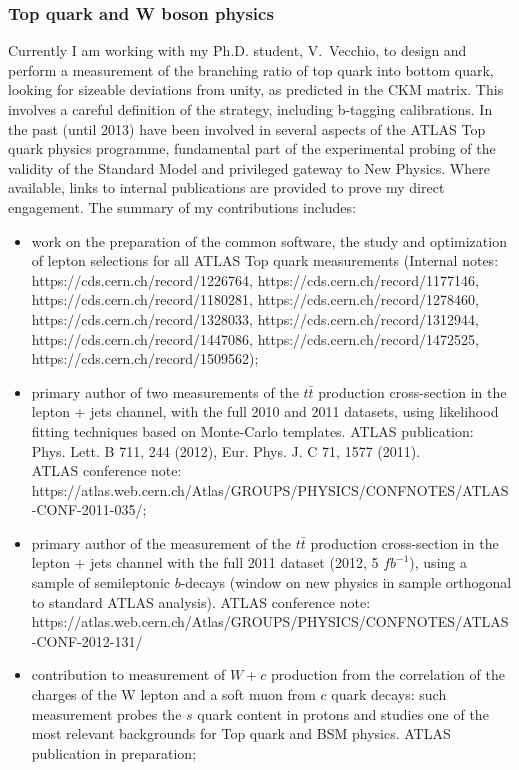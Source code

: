 \documentclass{article}
\begin{document}
\begin{vita}
\subsubsection*{Top quark and W boson physics}
Currently I am working with my Ph.D. student, V.~Vecchio, to design and perform a measurement of the branching ratio of top quark into bottom quark, looking for sizeable deviations from unity, as predicted in the CKM matrix. This involves a careful definition of the strategy, including b-tagging calibrations. 
In the past (until 2013) have been involved in several aspects of the ATLAS Top quark physics programme, fundamental part of the experimental probing of the validity of the Standard Model and privileged gateway to New Physics. 
Where available, links to internal publications are provided to prove my direct engagement. The summary of my contributions includes: 
\begin{itemize}
\item work on the preparation of the common software, the study and optimization of lepton selections for all ATLAS Top quark measurements (Internal notes: https://cds.cern.ch/record/1226764, https://cds.cern.ch/record/1177146, \\ https://cds.cern.ch/record/1180281, https://cds.cern.ch/record/1278460, \\ https://cds.cern.ch/record/1328033, https://cds.cern.ch/record/1312944, \\ https://cds.cern.ch/record/1447086, https://cds.cern.ch/record/1472525, \\ https://cds.cern.ch/record/1509562);
\item primary author of two measurements of the $t\bar{t}$ production cross-section in the lepton + jets channel, with the full 2010 and 2011 datasets, using likelihood fitting techniques based on Monte-Carlo templates. ATLAS publication: Phys. Lett. B 711, 244 (2012), Eur. Phys. J. C 71, 1577 (2011). \\ ATLAS conference note: https://atlas.web.cern.ch/Atlas/GROUPS/PHYSICS/CONFNOTES/ATLAS-CONF-2011-035/; 
\item primary author of the measurement of the $t\bar{t}$ production cross-section in the lepton + jets channel with the full 2011 dataset (2012, 5 $fb^{-1}$), using a sample of semileptonic $b$-decays (window on new physics in sample orthogonal to standard ATLAS analysis). ATLAS conference note: https://atlas.web.cern.ch/Atlas/GROUPS/PHYSICS/CONFNOTES/ATLAS-CONF-2012-131/ 
\item contribution to measurement of $W+c$ production from the correlation of the charges of the W lepton and a soft muon from $c$ quark decays: such measurement probes the $s$ quark content in protons and studies one of the most relevant backgrounds for Top quark and BSM physics. ATLAS publication in preparation;
\end{itemize}


\end{vita}
\end{document}
